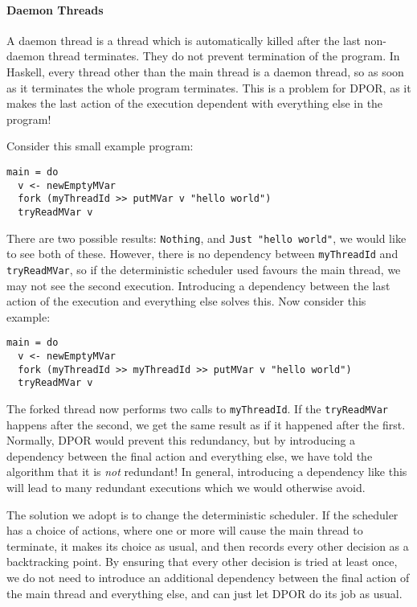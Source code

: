 \paragraph{Daemon Threads}
A daemon thread is a thread which is automatically killed after the
last non-daemon thread terminates.  They do not prevent termination of
the program.  In Haskell, every thread other than the main thread is a
daemon thread, so as soon as it terminates the whole program
terminates.  This is a problem for DPOR, as it makes the last action
of the execution dependent with everything else in the program!

Consider this small example program:

\begin{lstlisting}
main = do
  v <- newEmptyMVar
  fork (myThreadId >> putMVar v "hello world")
  tryReadMVar v
\end{lstlisting}

There are two possible results: \verb|Nothing|, and
\verb|Just "hello world"|, we would like to see both of these.
However, there is no dependency between \verb|myThreadId| and
\verb|tryReadMVar|, so if the deterministic scheduler used favours the
main thread, we may not see the second execution.  Introducing a
dependency between the last action of the execution and everything
else solves this.  Now consider this example:

\begin{lstlisting}
main = do
  v <- newEmptyMVar
  fork (myThreadId >> myThreadId >> putMVar v "hello world")
  tryReadMVar v
\end{lstlisting}

The forked thread now performs two calls to \verb|myThreadId|.  If the
\verb|tryReadMVar| happens after the second, we get the same result as
if it happened after the first.  Normally, DPOR would prevent this
redundancy, but by introducing a dependency between the final action
and everything else, we have told the algorithm that it is \emph{not}
redundant!  In general, introducing a dependency like this will lead
to many redundant executions which we would otherwise avoid.

The solution we adopt is to change the deterministic scheduler.  If
the scheduler has a choice of actions, where one or more will cause
the main thread to terminate, it makes its choice as usual, and then
records every other decision as a backtracking point.  By ensuring
that every other decision is tried at least once, we do not need to
introduce an additional dependency between the final action of the
main thread and everything else, and can just let DPOR do its job as
usual.

